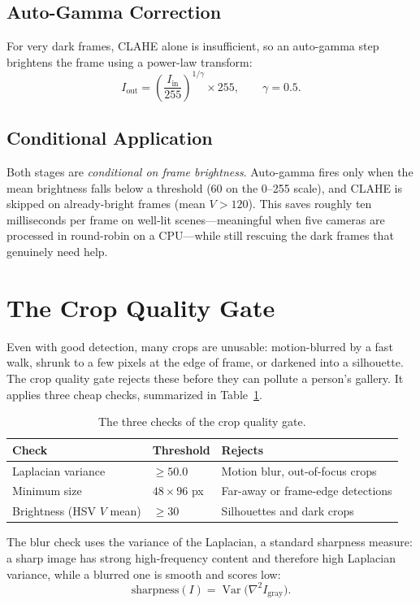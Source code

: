 \documentclass[12pt]{report}
\begin{document}
\subsection{Auto-Gamma Correction}
For very dark frames, CLAHE alone is insufficient, so an auto-gamma step brightens the frame using a power-law transform:
\[
I_{\text{out}} = \left( \frac{I_{\text{in}}}{255} \right)^{1/\gamma} \times 255, \qquad \gamma = 0.5 .
\]

\subsection{Conditional Application}
Both stages are \emph{conditional on frame brightness}. Auto-gamma fires only when the mean brightness falls below a threshold (60 on the 0--255 scale), and CLAHE is skipped on already-bright frames (mean $V > 120$). This saves roughly ten milliseconds per frame on well-lit scenes---meaningful when five cameras are processed in round-robin on a CPU---while still rescuing the dark frames that genuinely need help.

\section{The Crop Quality Gate}
Even with good detection, many crops are unusable: motion-blurred by a fast walk, shrunk to a few pixels at the edge of frame, or darkened into a silhouette. The crop quality gate rejects these before they can pollute a person's gallery. It applies three cheap checks, summarized in Table~\ref{tab:quality_gate}.

\begin{table}[H]
\centering
\begin{tabularx}{\textwidth}{|l|l|X|}
\hline
\textbf{Check} & \textbf{Threshold} & \textbf{Rejects} \\
\hline
Laplacian variance & $\geq 50.0$ & Motion blur, out-of-focus crops \\
\hline
Minimum size & $48 \times 96$ px & Far-away or frame-edge detections \\
\hline
Brightness (HSV $V$ mean) & $\geq 30$ & Silhouettes and dark crops \\
\hline
\end{tabularx}
\caption{The three checks of the crop quality gate.}
\label{tab:quality_gate}
\end{table}

The blur check uses the variance of the Laplacian, a standard sharpness measure: a sharp image has strong high-frequency content and therefore high Laplacian variance, while a blurred one is smooth and scores low:
\[
\text{sharpness}(I) = \operatorname{Var}\!\big(\nabla^2 I_{\text{gray}}\big).
\]
\end{document}
